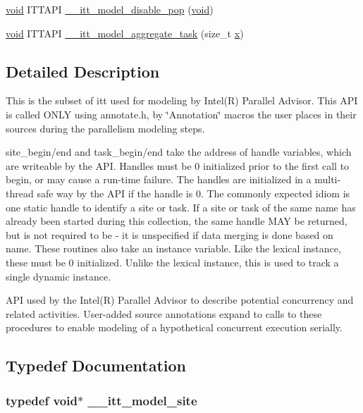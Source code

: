 \begin{DoxyCompactItemize}
\hyperlink{ittnotify__static_8h_af941d56e55e3c5465135b60c4d6343ed}{void} I\-T\-T\-A\-P\-I \hyperlink{group__model_gae0fa340a8815b1e4d29d7e8c59fa652a}{\-\_\-\-\_\-itt\-\_\-model\-\_\-disable\-\_\-pop} (\hyperlink{ittnotify__static_8h_af941d56e55e3c5465135b60c4d6343ed}{void})
\item 
\hyperlink{ittnotify__static_8h_af941d56e55e3c5465135b60c4d6343ed}{void} I\-T\-T\-A\-P\-I \hyperlink{group__model_gac165f33832cb92943a702e083fc4f637}{\-\_\-\-\_\-itt\-\_\-model\-\_\-aggregate\-\_\-task} (size\-\_\-t \hyperlink{ittnotify__static_8h_a25eb27b280775b27a5ddc4d1673225aa}{x})
\end{DoxyCompactItemize}


\subsection{Detailed Description}
This is the subset of itt used for modeling by Intel(\-R) Parallel Advisor. This A\-P\-I is called O\-N\-L\-Y using annotate.\-h, by \char`\"{}\-Annotation\char`\"{} macros the user places in their sources during the parallelism modeling steps.

site\-\_\-begin/end and task\-\_\-begin/end take the address of handle variables, which are writeable by the A\-P\-I. Handles must be 0 initialized prior to the first call to begin, or may cause a run-\/time failure. The handles are initialized in a multi-\/thread safe way by the A\-P\-I if the handle is 0. The commonly expected idiom is one static handle to identify a site or task. If a site or task of the same name has already been started during this collection, the same handle M\-A\-Y be returned, but is not required to be -\/ it is unspecified if data merging is done based on name. These routines also take an instance variable. Like the lexical instance, these must be 0 initialized. Unlike the lexical instance, this is used to track a single dynamic instance.

A\-P\-I used by the Intel(\-R) Parallel Advisor to describe potential concurrency and related activities. User-\/added source annotations expand to calls to these procedures to enable modeling of a hypothetical concurrent execution serially. 

\subsection{Typedef Documentation}
\hypertarget{group__model_ga920087b18ed59a70239461b5295cc26e}{
\subsubsection[{\-\_\-\-\_\-itt\-\_\-model\-\_\-site}]{\setlength{\rightskip}{0pt plus 5cm}typedef {\bf void}$\ast$ {\bf \-\_\-\-\_\-itt\-\_\-model\-\_\-site}}}\label{group__model_ga920087b18ed59a70239461b5295cc26e}


